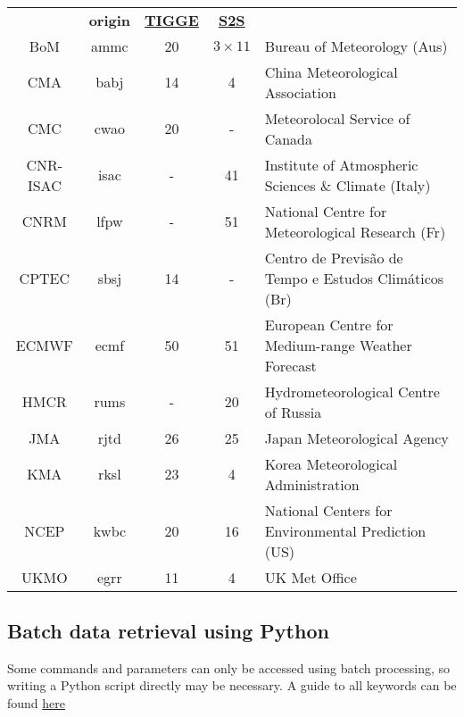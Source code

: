 \documentclass[10pt,fleqn]{article}
\begin{document}
\begin{framed}

 \\[10pt]
\begin{tabular}{c>{\ttfamily}cccl}
& \textbf{origin}& \textbf{\href{https://software.ecmwf.int/wiki/display/TIGGE/Models}{TIGGE}} & \textbf{\href{https://software.ecmwf.int/wiki/display/S2S/Models}{S2S}} & \\
BoM & ammc &20 &$3\times11$ & Bureau of Meteorology (Aus) \\
CMA & babj &14 &4 & China Meteorological Association \\
CMC & cwao &20 &-& Meteorolocal Service of Canada \\
CNR-ISAC & isac &-&41 & Institute of Atmospheric Sciences \& Climate (Italy)\\
CNRM & lfpw &-&51 & National Centre for Meteorological Research (Fr)\\
CPTEC & sbsj &14 &-& Centro de Previs\~{a}o de Tempo e Estudos Clim\'{a}ticos (Br) \\
ECMWF & ecmf &50 &51 &  European Centre for Medium-range Weather Forecast \\
HMCR & rums &-&20 & Hydrometeorological Centre of Russia\\
JMA & rjtd &26 &25 & Japan Meteorological Agency \\
KMA & rksl & 23 & 4 & Korea Meteorological Administration\\
NCEP & kwbc &20 &16 & National Centers for Environmental Prediction (US) \\
UKMO & egrr &11 &4 & UK Met Office\\
\end{tabular}

\end{framed}

\newpage
\subsection{Batch data retrieval using Python}
Some commands and parameters can only be accessed using batch processing, so writing a Python script directly may be necessary. A guide to all keywords can be found \href{https://software.ecmwf.int/wiki/display/UDOC/Identification+keywords#Identificationkeywords-class}{here}\\[7pt]
\end{document}
